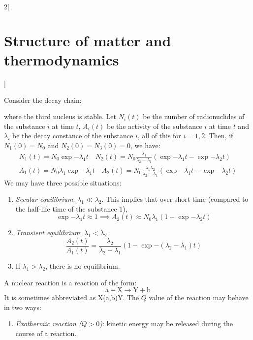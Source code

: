 \documentclass[../../../main.tex]{subfiles}
\begin{document}
\begin{multicols}{2}[\section{Structure of matter and thermodynamics}]
\begin{center}
\begin{minipage}{\linewidth}
    \end{minipage}
  \end{center}
  \begin{prop}
    Consider the decay chain:
    \begin{center}
      \begin{minipage}{\linewidth}
        \centering
        
      \end{minipage}
    \end{center}
    where the third nucleus is stable.
    Let $N_i(t)$ be the number of radionuclides of the substance $i$ at time $t$, $A_i(t)$ be the activity of the substance $i$ at time $t$ and $\lambda_i$ be the decay constance of the substance $i$, all of this for $i=1,2$. Then, if $N_1(0)=N_0$ and $N_2(0)=N_3(0)=0$, we have:
    \begin{gather*}
      N_1(t)=N_0\exp{-\lambda_1t}\quad N_2(t) =N_0\frac{\lambda_1}{\lambda_2-\lambda_1}\left(\exp{-\lambda_1t}-\exp{-\lambda_2t}\right)         \\
      A_1(t)=N_0\lambda_1\exp{-\lambda_1t}\quad A_2(t)=N_0\frac{\lambda_1\lambda_2}{\lambda_2-\lambda_1}\left(\exp{-\lambda_1t}-\exp{-\lambda_2t}\right)
    \end{gather*}
    We may have three possible situations:
    \begin{enumerate}
      \item \textit{Secular equilibrium}: $\lambda_1\ll\lambda_2$. This implies that over short time (compared to the half-life time of the substance 1), $$\exp{-\lambda_1 t}\approx 1\implies A_2(t)\approx N_0\lambda_1(1-\exp{-\lambda_2t})$$
      \item \textit{Transient equilibrium}: $\lambda_1<\lambda_2$.
            $$\frac{A_2(t)}{A_1(t)}=\frac{\lambda_2}{\lambda_2-\lambda_1}\left(1-\exp{-(\lambda_2-\lambda_1)t}\right)$$
      \item If $\lambda_1>\lambda_2$, there is no equilibrium.
    \end{enumerate}
  \end{prop}
  \begin{definition}
    A nuclear reaction is a reaction of the form:
    $$\text{a}+\text{X}\rightarrow\text{Y}+\text{b}$$
    It is sometimes abbreviated as X(a,b)Y. The $Q$ value of the reaction may behave in two ways:
    \begin{enumerate}
      \item \textit{Exothermic reaction ($Q>0$)}: kinetic energy may be released during the course of a reaction.

\end{enumerate}
\end{definition}
\end{multicols}
\end{document}
